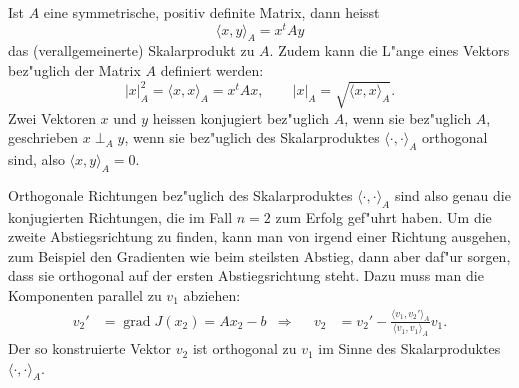 \begin{definition}
Ist $A$ eine symmetrische, positiv definite Matrix, dann heisst
\[
\langle x,y\rangle_A=x^tAy
\]
das (verallgemeinerte) Skalarprodukt zu $A$.
Zudem kann die L"ange eines Vektors bez"uglich der Matrix $A$ definiert
werden:
\[
|x|_A^2=\langle x,x\rangle_A=x^tAx,\qquad |x|_A=\sqrt{\langle x,x\rangle_A}.
\]
Zwei Vektoren $x$ und $y$ heissen konjugiert bez"uglich $A$,
wenn sie bez"uglich $A$, geschrieben $x\perp_A y$, wenn sie
bez"uglich des Skalarproduktes $\langle\cdot,\cdot\rangle_A$
orthogonal sind, also $\langle x,y\rangle_A=0$.
\end{definition}

Orthogonale Richtungen bez"uglich des Skalarproduktes
$\langle\cdot,\cdot\rangle_A$ sind also genau die konjugierten Richtungen,
die im Fall $n=2$ zum Erfolg gef"uhrt haben.
Um die zweite Abstiegsrichtung  zu finden, kann man von irgend einer Richtung
ausgehen, zum Beispiel den Gradienten wie beim steilsten Abstieg, dann
aber daf"ur sorgen, dass sie orthogonal auf der ersten Abstiegsrichtung
steht.
Dazu muss man die Komponenten parallel zu $v_1$ abziehen:
\begin{align*}
v_2'&=\operatorname{grad}J(x_2)=Ax_2-b
&\Rightarrow&
&
v_2&=v_2'-\frac{\langle v_1,v_2'\rangle_A}{\langle v_1,v_1\rangle_A}v_1.
\end{align*}
Der so konstruierte Vektor $v_2$ ist orthogonal zu $v_1$ im Sinne
des Skalarproduktes $\langle\cdot,\cdot\rangle_A$.

